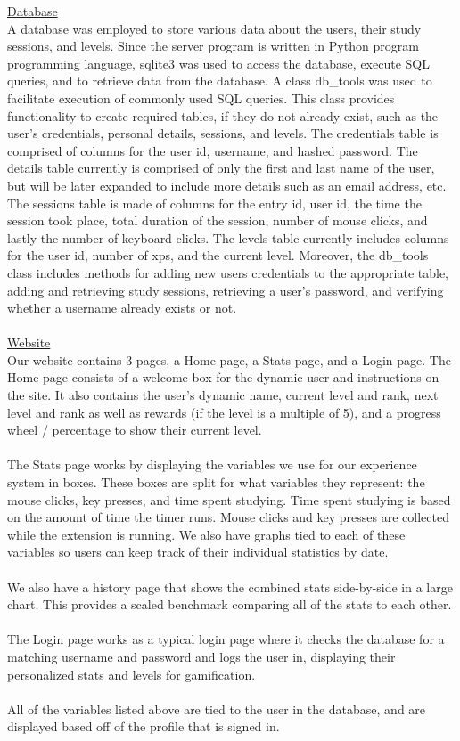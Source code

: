 \documentclass[12pt]{article}
\begin{document}
\noindent \underline{Database}
\\A database was employed to store various data about the users, their study sessions, and levels. Since the server program is written in Python program programming language, sqlite3 was used to access the database, execute SQL queries, and to retrieve data from the database. A class db\_tools was used to facilitate execution of commonly used SQL queries. This class provides functionality to create required tables, if they do not already exist, such as the user's credentials, personal details, sessions, and levels. The credentials table is comprised of columns for the user id, username, and hashed password. The details table currently is comprised of only the first and last name of the user, but will be later expanded to include more details such as an email address, etc. The sessions table is made of columns for the entry id, user id, the time the session took place, total duration of the session, number of mouse clicks, and lastly the number of keyboard clicks. The levels table currently includes columns for the user id, number of xps, and the current level.  Moreover, the db\_tools class includes methods for adding new users credentials to the appropriate table, adding and retrieving study sessions, retrieving a user's password, and verifying whether a username already exists or not. \\\\


\noindent \underline{Website} \\
Our website contains 3 pages, a Home page, a Stats page, and a Login page. The Home page consists of a welcome box for the dynamic user and instructions on the site. It also contains the user’s dynamic name, current level and rank, next level and rank as well as rewards (if the level is a multiple of 5), and a progress wheel / percentage to show their current level.
\\\\The Stats page works by displaying the variables we use for our experience system in boxes. These boxes are split for what variables they represent: the mouse clicks, key presses, and time spent studying. Time spent studying is based on the amount of time the timer runs. Mouse clicks and key presses are collected while the extension is running. We also have graphs tied to each of these variables so users can keep track of their individual statistics by date.
\\\\We also have a history page that shows the combined stats side-by-side in a large chart. This provides a scaled benchmark comparing all of the stats to each other.
\\\\The Login page works as a typical login page where it checks the database for a matching username and password and logs the user in, displaying their personalized stats and levels for gamification.
\\\\All of the variables listed above are tied to the user in the database, and are displayed based off of the profile that is signed in.
\\\\
\end{document}

